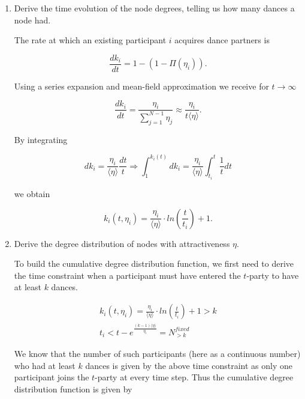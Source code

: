 \begin{enumerate}
	\item Derive the time evolution of the node degrees, telling us how many dances a node had.
	
	The rate at which an existing participant $i$ acquires dance partners is
	
	\begin{equation*}
		 \frac{dk_i}{dt} = 1 - (1 - \Pi(\eta_i)).
	\end{equation*}

	Using a series expansion and mean-field approximation we receive for $t \rightarrow \infty$
	
	\begin{equation*}
		\frac{dk_i}{dt} = \frac{\eta_i}{\sum_{j=1}^{N-1} \eta_j} \approx \frac{\eta_i}{t \langle \eta \rangle}.
	\end{equation*}

	By integrating 
	
	\begin{equation*}
		dk_i = \frac{\eta_i}{\langle \eta \rangle} \frac{dt}{t} \Rightarrow \int_{1}^{k_i(t)} dk_i = \frac{\eta_i}{\langle \eta \rangle} \int_{t_i}^{t} \frac{1}{t} dt
	\end{equation*}

	we obtain
	
	\begin{equation*}
		k_i(t, \eta_i) = \frac{\eta_i}{\langle \eta \rangle} \cdot ln(\frac{t}{t_i}) + 1.
	\end{equation*}
	
	\item Derive the degree distribution of nodes with attractiveness $\eta$.
	
	To build the cumulative degree distribution function, we first need to derive the time constraint when a participant must have entered the $t$-party to have at least $k$ dances.
	
	\begin{equation*}
		\begin{split}
			k_i(t, \eta_i) = \frac{\eta_i}{\langle \eta \rangle} \cdot ln(\frac{t}{t_i}) + 1 > k \\
			t_i < t - e^{\frac{(k - 1) \langle \eta \rangle}{\eta_i}} = N_{>k}^{fixed}
		\end{split}
	\end{equation*}

	We know that the number of such participants (here as a continuous number) who had at least $k$ dances is given by the above time constraint as only one participant joins the $t$-party at every time step. Thus the cumulative degree distribution function is given by
	

\end{enumerate}
